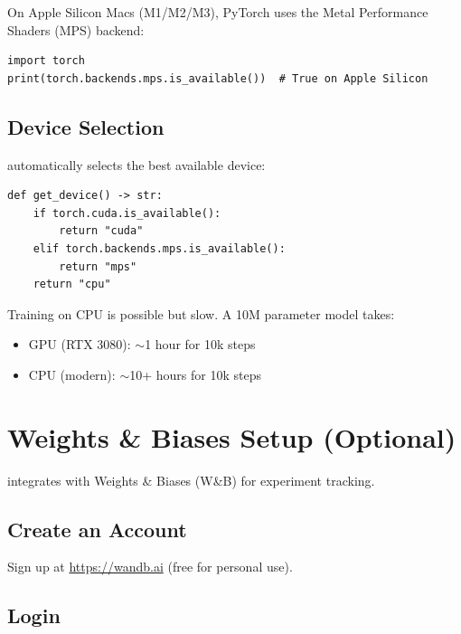 On Apple Silicon Macs (M1/M2/M3), PyTorch uses the Metal Performance Shaders (MPS) backend:

\begin{lstlisting}[style=python]
import torch
print(torch.backends.mps.is_available())  # True on Apple Silicon
\end{lstlisting}

\subsection{Device Selection}

\TryLM automatically selects the best available device:

\begin{lstlisting}[style=python, caption={Device selection from cli.py}]
def get_device() -> str:
    if torch.cuda.is_available():
        return "cuda"
    elif torch.backends.mps.is_available():
        return "mps"
    return "cpu"
\end{lstlisting}

\begin{note}
Training on CPU is possible but slow. A 10M parameter model takes:
\begin{itemize}
    \item GPU (RTX 3080): $\sim$1 hour for 10k steps
    \item CPU (modern): $\sim$10+ hours for 10k steps
\end{itemize}
\end{note}

\section{Weights \& Biases Setup (Optional)}

\TryLM integrates with Weights \& Biases (W\&B) for experiment tracking.

\subsection{Create an Account}

Sign up at \url{https://wandb.ai} (free for personal use).

\subsection{Login}


